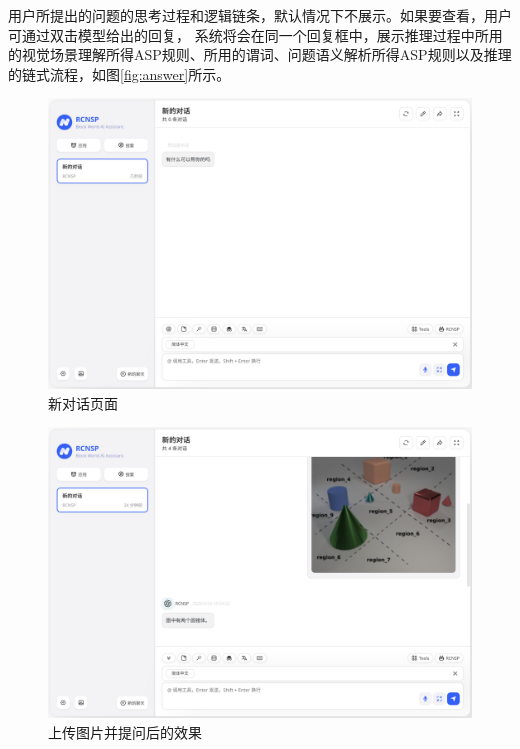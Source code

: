 用户所提出的问题的思考过程和逻辑链条，默认情况下不展示。如果要查看，用户可通过双击模型给出的回复，
系统将会在同一个回复框中，展示推理过程中所用的视觉场景理解所得ASP规则、所用的谓词、问题语义解析所得ASP规则以及推理的链式流程，如图\ref{fig:answer}所示。
\begin{figure}[h]
    \centering
    \includegraphics[scale=0.35]{figures/frontend-welcome-page.png}
    \caption{新对话页面}
    \label{fig:welcome-page}
\end{figure}
\begin{figure}[h]
    \centering
    \includegraphics[scale=0.3]{figures/question.png}
    \caption{上传图片并提问后的效果}
    \label{fig:question}
\end{figure}
